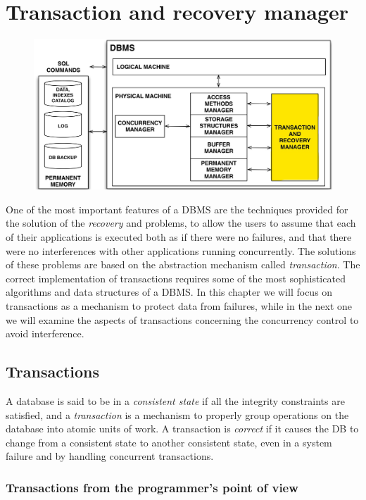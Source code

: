 \section{Transaction and recovery manager}

\begin{figure}[h!]
		\centering
		\includegraphics[scale = 0.7]{img/tr1.jpg}
		\label{tr1}
\end{figure}

One of the most important features of a DBMS are the techniques provided for the solution of the \textit{recovery} and \textit{} problems, to allow the users to assume that each of their applications is executed both as if there were no failures, and that there were no interferences with other applications running concurrently. The solutions of these problems are based on the abstraction mechanism called \textit{transaction}. The correct implementation of transactions requires some of the most sophisticated algorithms and data structures of a DBMS. In this chapter we will focus on transactions as a mechanism to protect data from failures, while in the next one we will examine the aspects of transactions concerning the concurrency control to avoid interference.

\subsection{Transactions}
A database is said to be in a \textit{consistent state} if all the integrity constraints are satisfied, and a \textit{transaction} is a mechanism to properly group operations on the database into atomic units of work. A transaction is \textit{correct} if it causes the DB to change from a consistent state to another consistent state, even in a system failure and by handling concurrent transactions.

\subsubsection{Transactions from the programmer's point of view}

